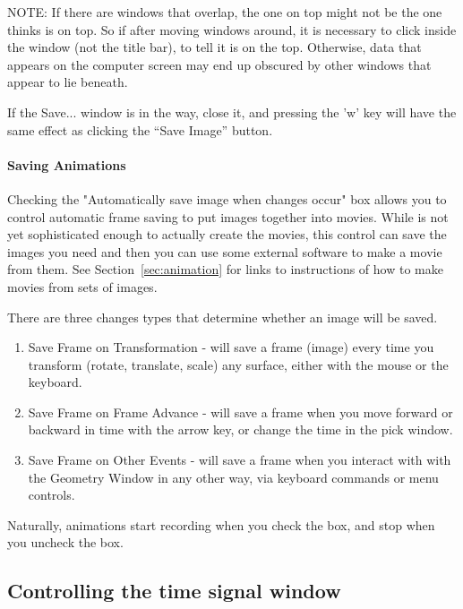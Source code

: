 NOTE: If there are windows that overlap, the one on top might not be the one
\map{} thinks is on top.  So if after moving windows around, it is
necessary to click inside the
window (not the title bar), to tell \map{} it is on the top.  Otherwise,
data that appears on the computer screen may end up obscured by other
windows that appear to lie beneath. 

If the Save... window is in the way, close it, and pressing the 'w'
key will have the same effect as clicking the ``Save Image'' button. 

\paragraph{Saving Animations}
\label{sec:saveanimations}

Checking the "Automatically save image when changes occur" box
allows you to control automatic frame saving to put images 
together into movies.  While \map{} is not yet sophisticated enough to 
actually create the movies, this control can save the images you need and
then you can use some external software to make a movie from them.
See Section~\ref{sec:animation} for links to instructions of how to make 
movies from sets of images. 

\medskip
There are three changes types that determine whether an image will be saved.  
%
\begin{enumerate}
  \item Save Frame on Transformation - will save a frame (image) every
        time you transform (rotate, translate, scale) any surface, either 
        with the mouse or the keyboard.
  \item Save Frame on Frame Advance - will save a frame when you move 
        forward or backward in time with the arrow key, or change the time
        in the pick window.
  \item Save Frame on Other Events - will save a frame when you interact with
        with the Geometry Window in any other way, via keyboard commands or 
        menu controls.
\end{enumerate}
\medskip

Naturally, animations start recording when you check the box, and stop 
when you uncheck the box.


\subsection{Controlling the time signal window}
\label{sec:control-scalar} 



